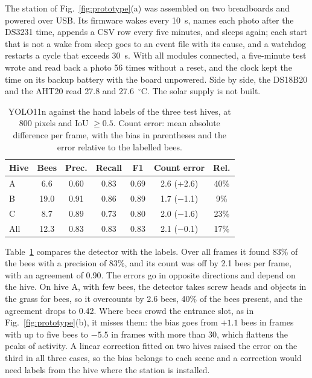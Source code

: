 \documentclass[english,hidelinks]{sbrt}
\begin{document}
The station of Fig.~\ref{fig:prototype}(a) was assembled on two breadboards and powered over USB. Its firmware wakes every 10~s, names each photo after the DS3231 time, appends a CSV row every five minutes, and sleeps again; each start that is not a wake from sleep goes to an event file with its cause, and a watchdog restarts a cycle that exceeds 30~s. With all modules connected, a five-minute test wrote and read back a photo 56 times without a reset, and the clock kept the time on its backup battery with the board unpowered. Side by side, the DS18B20 and the AHT20 read 27.8 and 27.6~$^\circ$C. The solar supply is not built.

\begin{table}[t]
\caption{YOLO11n against the hand labels of the three test hives, at 800 pixels and IoU $\geq 0.5$. Count error: mean absolute difference per frame, with the bias in parentheses and the error relative to the labelled bees.}
\label{tab:detection}
\centering
\footnotesize
\setlength{\tabcolsep}{3pt}
\begin{tabular}{lcccccc}
\hline
Hive & Bees & Prec. & Recall & F1 & Count error & Rel. \\
\hline
A & 6.6 & 0.60 & 0.83 & 0.69 & 2.6 (+2.6) & 40\% \\
B & 19.0 & 0.91 & 0.86 & 0.89 & 1.7 ($-$1.1) & 9\% \\
C & 8.7 & 0.89 & 0.73 & 0.80 & 2.0 ($-$1.6) & 23\% \\
All & 12.3 & 0.83 & 0.83 & 0.83 & 2.1 ($-$0.1) & 17\% \\
\hline
\end{tabular}
\end{table}

Table~\ref{tab:detection} compares the detector with the labels. Over all frames it found 83\% of the bees with a precision of 83\%, and its count was off by 2.1 bees per frame, with an agreement of 0.90. The errors go in opposite directions and depend on the hive. On hive A, with few bees, the detector takes screw heads and objects in the grass for bees, so it overcounts by 2.6 bees, 40\% of the bees present, and the agreement drops to 0.42. Where bees crowd the entrance slot, as in Fig.~\ref{fig:prototype}(b), it misses them: the bias goes from $+1.1$ bees in frames with up to five bees to $-5.5$ in frames with more than 30, which flattens the peaks of activity. A linear correction fitted on two hives raised the error on the third in all three cases, so the bias belongs to each scene and a correction would need labels from the hive where the station is installed.
\end{document}
